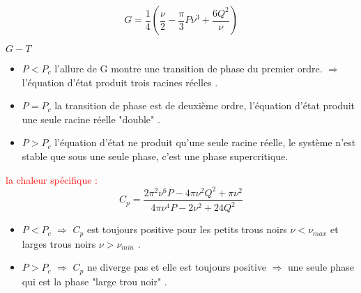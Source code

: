 \documentclass{beamer}
\begin{document}
\begin{frame}
$$G=\dfrac{1}{4}\left(\dfrac{\nu}{2}-\dfrac{\pi}{3}P\nu^{3}+\dfrac{6Q^{2}}{\nu} \right)$$

	\end{frame}
\begin{frame}
		
		\begin{block}{$G-T$}
			\begin{itemize}
				\item $P<P_{c} $ l'allure de G montre une transition de phase du premier ordre. $\Rightarrow$ l'équation d’état produit trois racines réelles .
				
				\item $P = P_{c}$ la transition de phase est de deuxième ordre, l'équation d’état produit une
				seule racine réelle "double" .
				\item $P > P_{c}$ l'équation d'état ne produit qu'une seule racine réelle, le système n'est
				stable que sous une seule phase, c'est une phase supercritique.
				
			\end{itemize}
		\end{block}
	
\end{frame}
\begin{frame}
\textcolor{red}{la chaleur spécifique :} 
$$C_{p}=\dfrac{2\pi^{2}\nu^{6}P-4\pi \nu^{2}Q^{2}+\pi \nu^{2}}{4\pi \nu^{4}P-2\nu^{2}+24Q^{2}}$$
\pause
		\pause
\begin{itemize}
	\item $P<P_{c} $ $\Rightarrow$ $C_{p}$ est
	toujours positive pour les petits trous noirs $ \nu <\nu_{max} $ et larges trous noirs $ \nu > \nu_{min}$ .
		\end{itemize}
	

	
	\end{frame}
	\begin{frame}
	
	\begin{itemize}
		\item $P>P_{c} $ $\Rightarrow$ $C_{p}$  ne diverge pas et elle est toujours positive $\Rightarrow$ une seule phase qui est la phase "large trou noir" .
	\end{itemize}

	


\end{frame}
\end{document}
